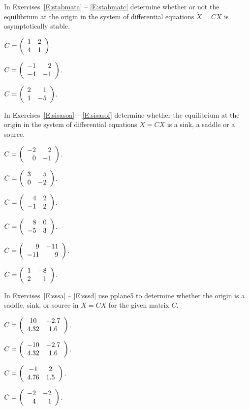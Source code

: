 \documentclass{ximera}
\begin{document}
\EXER

\TEXER


\noindent In Exercises~\ref{E:stabmata} -- \ref{E:stabmatc} determine
whether or not the equilibrium at the origin in the system of differential
equations $\dot{X}=CX$ is asymptotically stable.
\begin{exercise} \label{E:stabmata}
$C=\left(\begin{array}{rr} 1 & 2\\ 4 &1\end{array}\right)$.
\end{exercise}
\begin{exercise} \label{E:stabmatb}
$C=\left(\begin{array}{rr} -1 & 2\\ -4 &-1\end{array}\right)$.
\end{exercise}
\begin{exercise} \label{E:stabmatc}
$C=\left(\begin{array}{rr} 2 & 1\\ 1 &-5\end{array}\right)$.
\end{exercise}

\noindent In Exercises~\ref{E:sisasoa} -- \ref{E:sisasof} determine
whether the equilibrium at the origin in the system of differential
equations $\dot{X}=CX$ is a sink, a saddle or a source.
\begin{exercise} \label{E:sisasoa}
$C=\left(\begin{array}{rr} -2 & 2\\ 0 &-1\end{array}\right)$.
\end{exercise}
\begin{exercise} \label{E:sisasob}
$C=\left(\begin{array}{rr} 3 & 5\\ 0 &-2\end{array}\right)$.
\end{exercise}
\begin{exercise} \label{E:sisasoc}
$C=\left(\begin{array}{rr} 4 & 2\\ -1 &2\end{array}\right)$.
\end{exercise}
\begin{exercise} \label{E:sisasod}
$C=\left(\begin{array}{rr} 8 & 0\\ -5 &3\end{array}\right)$.
\end{exercise}
\begin{exercise} \label{E:sisasoe}
$C=\left(\begin{array}{rr} 9 & -11\\ -11 &9\end{array}\right)$.
\end{exercise}
\begin{exercise} \label{E:sisasof}
$C=\left(\begin{array}{rr} 1 & -8\\ 2 &1\end{array}\right)$.
\end{exercise}

\CEXER

\noindent In Exercises~\ref{E:sssa} -- \ref{E:sssd} use {\sf pplane5} to
determine whether the origin is a saddle, sink, or source in $\dot{X}=CX$
for the given matrix $C$.
\begin{exercise} \label{E:sssa}
$C=\left(\begin{array}{cc} 10 & -2.7\\ 4.32 &1.6\end{array}\right)$.
\end{exercise}
\begin{exercise} \label{E:sssb}
$C=\left(\begin{array}{cc} -10 & -2.7\\ 4.32 &1.6\end{array}\right)$.
\end{exercise}
\begin{exercise} \label{E:sssc}
$C=\left(\begin{array}{cc} -1 & 2\\ 4.76 &1.5\end{array}\right)$.
\end{exercise}
\begin{exercise} \label{E:sssd}
$C=\left(\begin{array}{rr} -2 & -2\\ 4 &1\end{array}\right)$.
\end{exercise}
\end{document}
